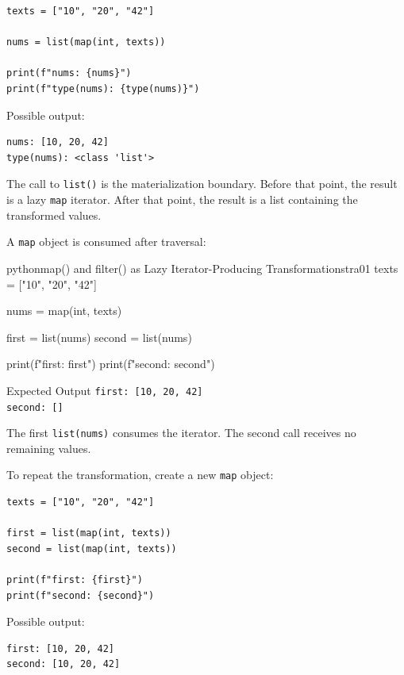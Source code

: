 \documentclass[a4paper,twoside]{report}
\begin{document}
\begin{verbatim}
texts = ["10", "20", "42"]

nums = list(map(int, texts))

print(f"nums: {nums}")
print(f"type(nums): {type(nums)}")
\end{verbatim}

Possible output:

\begin{verbatim}
nums: [10, 20, 42]
type(nums): <class 'list'>
\end{verbatim}

The call to \texttt{list()} is the materialization boundary. Before that point, the result is a lazy \texttt{map} iterator. After that point, the result is a list containing the transformed values.

A \texttt{map} object is consumed after traversal:

\begin{codebox}[]{python}{map() and filter() as Lazy Iterator-Producing Transformations}{tra01}
texts = ["10", "20", "42"]

nums = map(int, texts)

first = list(nums)
second = list(nums)

print(f"first: {first}")
print(f"second: {second}")
\end{codebox}


\begin{iobox}{Expected Output}
\texttt{first: [10, 20, 42]} \\
\texttt{second: []} \\
\end{iobox}


The first \texttt{list(nums)} consumes the iterator. The second call receives no remaining values.

To repeat the transformation, create a new \texttt{map} object:

\begin{verbatim}
texts = ["10", "20", "42"]

first = list(map(int, texts))
second = list(map(int, texts))

print(f"first: {first}")
print(f"second: {second}")
\end{verbatim}

Possible output:

\begin{verbatim}
first: [10, 20, 42]
second: [10, 20, 42]
\end{verbatim}
\end{document}

